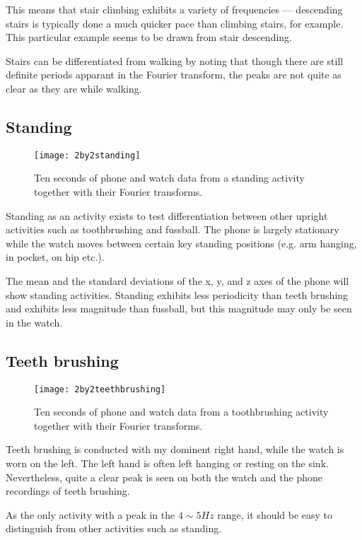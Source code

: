       This means that stair climbing exhibits a variety of frequencies --- descending stairs is typically done a much quicker pace than climbing stairs, for example. This particular example seems to be drawn from stair descending.
      
      Stairs can be differentiated from walking by noting that though there are still definite periods apparant in the Fourier transform, the peaks are not quite as clear as they are while walking.
    \subsection{Standing}
      \begin{figure}
        \centering
        \texttt{[image: 2by2standing]}
        \caption{Ten seconds of phone and watch data from a standing activity together with their Fourier transforms.}
        \label{fig:2by2standing}
      \end{figure}
      Standing as an activity exists to test differentiation between other upright activities such as toothbrushing and fussball. The phone is largely stationary while the watch moves between certain key standing positions (e.g. arm hanging, in pocket, on hip etc.). 
      
      The mean and the standard deviations of the x, y, and z axes of the phone will show standing activities. Standing exhibits less periodicity than teeth brushing and exhibits less magnitude than fussball, but this magnitude may only be seen in the watch.
    \subsection{Teeth brushing}
      \begin{figure}[!th]
        \centering
        \texttt{[image: 2by2teethbrushing]}
        \caption{Ten seconds of phone and watch data from a toothbrushing activity together with their Fourier transforms.}
        \label{fig:2by2teethbrushing}
      \end{figure}
      
      Teeth brushing is conducted with my dominent right hand, while the watch is worn on the left. The left hand is often left hanging or resting on the sink. Nevertheless, quite a clear peak is seen on both the watch and the phone recordings of teeth brushing.
      
      As the only activity with a peak in the $4 \sim 5 \si{Hz}$ range, it should be easy to distinguish from other activities such as standing.
